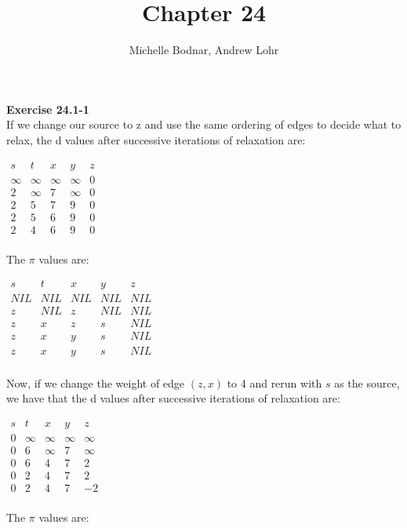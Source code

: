 \documentclass{article}
\title{Chapter 24}
\author{Michelle Bodnar, Andrew Lohr}
\begin{document}
\maketitle
\noindent\textbf{Exercise 24.1-1}\\
If we change our source to z and use the same ordering of edges to decide what to relax, the d values after successive iterations of relaxation are:

\begin{center}
$
\begin{array}{|c|c|c|c|c|}
s&t&x&y&z\\
\hline
\infty&\infty&\infty&\infty&0\\
2&\infty&7&\infty&0\\
2&5&7&9&0\\
2&5&6&9&0\\
2&4&6&9&0\\
\end{array}
$
\end{center}

The $\pi$ values are:

\begin{center}
$
\begin{array}{|c|c|c|c|c|}
s&t&x&y&z\\
\hline
NIL&NIL&NIL&NIL&NIL\\
z&NIL&z&NIL&NIL\\
z&x&z&s&NIL\\
z&x&y&s&NIL\\
z&x&y&s&NIL\\
\end{array}
$
\end{center}


Now, if we change the weight of edge $(z,x)$ to 4 and rerun with $s$ as the source, we have that the d values after successive iterations of relaxation are:

\begin{center}
$
\begin{array}{|c|c|c|c|c|}
s&t&x&y&z\\
\hline
0&\infty&\infty&\infty&\infty\\
0&6&\infty&7&\infty\\
0&6&4&7&2\\
0&2&4&7&2\\
0&2&4&7&-2\\
\end{array}
$
\end{center}


The $\pi$ values are:
\end{document}

